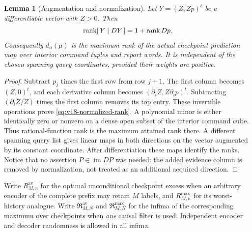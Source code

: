 \documentclass[11pt]{amsart}
\newtheorem{lemma}[theorem]{Lemma}
\theoremstyle{definition}\newtheorem{definition}[theorem]{Definition}
\theoremstyle{remark}\newtheorem{remark}[theorem]{Remark}
\begin{document}
\begin{lemma}[Augmentation and normalization]\label{lem:v18-normalized-rank}
Let $Y=(Z,Zp)^t$ be a differentiable vector with $Z>0$. Then
\begin{equation}\label{eq:v18-normalized-rank}
 \operatorname{rank}[\,Y\mid DY\,]=1+\operatorname{rank} Dp.
\end{equation}
Consequently $d_n(\mu)$ is the maximum rank of the actual checkpoint
prediction map over interior command tuples and report words. It is
independent of the chosen spanning query coordinates, provided their
weights are positive.
\end{lemma}
\begin{proof}
Subtract $p_j$ times the first row from row $j+1$. The first column
becomes $(Z,0)^t$, and each derivative column becomes
$(\partial_iZ,Z\partial_ip)^t$. Subtracting
$(\partial_iZ/Z)$ times the first column removes its top entry.
These invertible operations prove \eqref{eq:v18-normalized-rank}.
A polynomial minor is either identically zero or nonzero on a dense
open subset of the interior command cube. Thus rational-function rank
is the maximum attained rank there. A different spanning query list
gives linear maps in both directions on the vector augmented by its
constant coordinate. After differentiation these maps identify the
ranks. Notice that no assertion $P\in\operatorname{im}DP$ was needed:
the added evidence column is removed by normalization, not treated as
an additional acquired direction.
\end{proof}

Write $R^{\mathrm{av}}_{M,n}$ for the optimal unconditional checkpoint
excess when an arbitrary encoder of the complete prefix may retain
$M$ labels, and $R^{\mathrm{max}}_{M,n}$ for its worst-history analogue.
Write $\mathfrak R^{\mathrm{av}}_{M,N}$ and
$\mathfrak R^{\mathrm{max}}_{M,N}$ for the infima of the corresponding
maximum over checkpoints when \emph{one} causal filter is used.
Independent encoder and decoder randomness is allowed in all infima.
\end{document}
